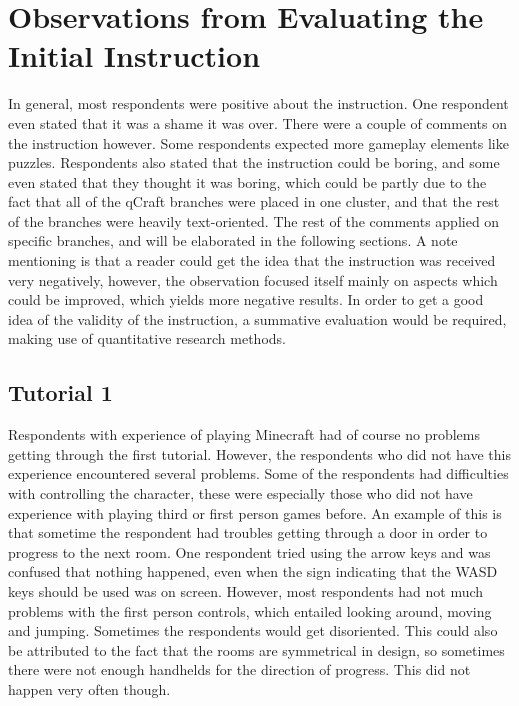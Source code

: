 \documentclass[11pt,twoside]{report} %
\begin{document}
\section{Observations from Evaluating the Initial Instruction}

In general, most respondents were positive about the instruction. One respondent even stated that it was a shame it was over. There were a couple of comments on the instruction however. Some respondents expected more gameplay elements like puzzles. Respondents also stated that the instruction could be boring, and some even stated that they thought it was boring, which could be partly due to the fact that all of the qCraft branches were placed in one cluster, and that the rest of the branches were heavily text-oriented. The rest of the comments applied on specific branches, and will be elaborated in the following sections. A note mentioning is that a reader could get the idea that the instruction was received very negatively, however, the observation focused itself mainly on aspects which could be improved, which yields more negative results. In order to get a good idea of the validity of the instruction, a summative evaluation would be required, making use of quantitative research methods.

\subsection{Tutorial 1}

Respondents with experience of playing Minecraft had of course no problems getting through the first tutorial. However, the respondents who did not have this experience encountered several problems. Some of the respondents had difficulties with controlling the character, these were especially those who did not have experience with playing third or first person games before. An example of this is that sometime the respondent had troubles getting through a door in order to progress to the next room. One respondent tried using the arrow keys and was confused that nothing happened, even when the sign indicating that the WASD keys should be used was on screen. However, most respondents had not much problems with the first person controls, which entailed looking around, moving and jumping. Sometimes the respondents would get disoriented. This could also be attributed to the fact that the rooms are symmetrical in design, so sometimes there were not enough handhelds for the direction of progress. This did not happen very often though.
\end{document}

